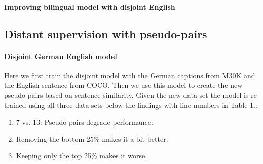 \paragraph{Improving bilingual model with disjoint English}



\subsection{Distant supervision with pseudo-pairs}

\paragraph{Disjoint German English model}
Here we first train the disjoint model with the German captions from M30K
and the English sentence from COCO. Then we use this model to create the 
new pseudo-pairs based on sentence similarity. Given the new data set the
model is re-trained using all three data sets below the findings with  
line numbers in Table 1.:

\begin{enumerate}
    \item 7 vs. 13: Pseudo-pairs degrade performance.
    \item Removing the bottom 25\% makes it a bit better.
    \item Keeping only the top 25\% makes it worse.
\end{enumerate}

